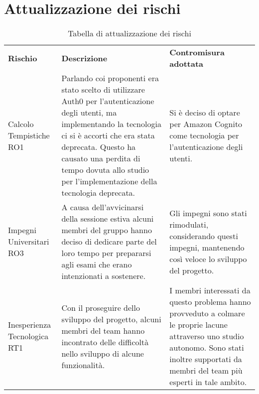 \section{Attualizzazione dei rischi}
\begin{center}
    \begin{table}[h!]
        \centering
        \caption{Tabella di attualizzazione dei rischi}
        \vspace{5px}
        \renewcommand{\arraystretch}{1.8}
        \begin{tabular}{p{90px} p{160px} p{160px}}
            \rowcolor{logo!70} \textbf{Rischio}   & \textbf{Descrizione}                                                                                                                                                                                                                                                                         & \textbf{Contromisura adottata}                                                                                                                                                                 \\
            Calcolo Tempistiche RO1               & Parlando coi proponenti era stato scelto di utilizzare Auth0 per l'autenticazione degli utenti, ma implementando la tecnologia ci si è accorti che era stata deprecata. \newline Questo ha causato una perdita di tempo dovuta allo studio per l'implementazione della tecnologia deprecata. & Si è deciso di optare per Amazon Cognito come tecnologia per l'autenticazione degli utenti.                                                                                                    \\
            Impegni Universitari RO3              & A causa dell'avvicinarsi della sessione estiva alcuni membri del gruppo hanno deciso di dedicare parte del \newline loro tempo per prepararsi agli esami che erano intenzionati a sostenere.                                                                                                  & Gli impegni sono stati rimodulati, considerando questi impegni, mantenendo così veloce lo sviluppo del progetto.                                                                                 \\
            Inesperienza \newline Tecnologica RT1 & Con il proseguire dello sviluppo del progetto, alcuni membri del team hanno incontrato  delle difficoltà nello sviluppo di alcune funzionalità.                                                                                                                                               & I membri interessati da questo problema hanno provveduto a colmare le proprie lacune attraverso uno studio autonomo. Sono stati inoltre supportati da membri del team più esperti in tale ambito. \\


\end{tabular}
\end{table}
\end{center}
